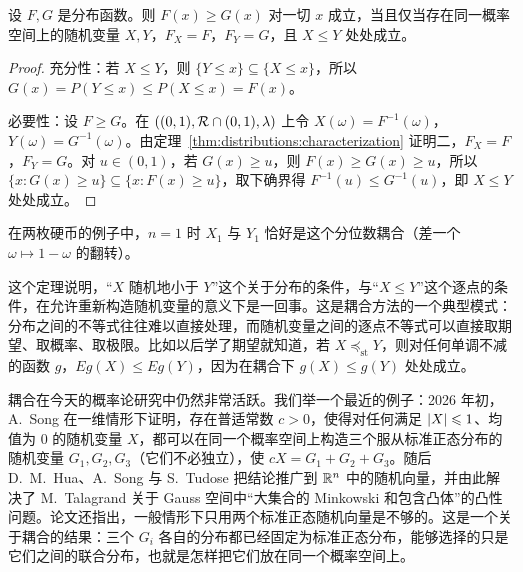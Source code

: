 \begin{theorem}[随机序的耦合刻画]\label{thm:distributions:stochastic-coupling}
设 $F,G$ 是分布函数。则 $F(x)\geqslant G(x)$ 对一切 $x$ 成立，当且仅当存在同一概率空间上的随机变量 $X,Y$，$F_X=F$，$F_Y=G$，且 $X\leqslant Y$ 处处成立。
\end{theorem}
\begin{proof}
充分性：若 $X\leqslant Y$，则 $\{Y\leqslant x\}\subseteq\{X\leqslant x\}$，所以 $G(x)=P(Y\leqslant x)\leqslant P(X\leqslant x)=F(x)$。

必要性：设 $F\geqslant G$。在 $((0,1),\mathcal{R}\cap(0,1),\lambda)$ 上令 $X(\omega)=F^{-1}(\omega)$，$Y(\omega)=G^{-1}(\omega)$。由定理~\ref{thm:distributions:characterization} 证明二，$F_X=F$，$F_Y=G$。对 $u\in(0,1)$，若 $G(x)\geqslant u$，则 $F(x)\geqslant G(x)\geqslant u$，所以 $\{x:G(x)\geqslant u\}\subseteq\{x:F(x)\geqslant u\}$，取下确界得 $F^{-1}(u)\leqslant G^{-1}(u)$，即 $X\leqslant Y$ 处处成立。
\end{proof}

在两枚硬币的例子中，$n=1$ 时 $X_1$ 与 $Y_1$ 恰好是这个分位数耦合（差一个 $\omega\mapsto1-\omega$ 的翻转）。

\begin{remark}
这个定理说明，“$X$ 随机地小于 $Y$”这个关于分布的条件，与“$X\leqslant Y$”这个逐点的条件，在允许重新构造随机变量的意义下是一回事。这是耦合方法的一个典型模式：分布之间的不等式往往难以直接处理，而随机变量之间的逐点不等式可以直接取期望、取概率、取极限。比如以后学了期望就知道，若 $X\preceq_{\mathrm{st}}Y$，则对任何单调不减的函数 $g$，$Eg(X)\leqslant Eg(Y)$，因为在耦合下 $g(X)\leqslant g(Y)$ 处处成立。
\end{remark}

\begin{historynote}
耦合在今天的概率论研究中仍然非常活跃。我们举一个最近的例子：2026 年初，A.\ Song 在一维情形下证明，存在普适常数 $c>0$，使得对任何满足 $\lvert X\rvert\leqslant1$、均值为 $0$ 的随机变量 $X$，都可以在同一个概率空间上构造三个服从标准正态分布的随机变量 $G_1,G_2,G_3$（它们不必独立），使 $cX=G_1+G_2+G_3$。随后 D.\ M.\ Hua、A.\ Song 与 S.\ Tudose 把结论推广到 $\mathbb{R}^n$ 中的随机向量，并由此解决了 M.\ Talagrand 关于 Gauss 空间中“大集合的 Minkowski 和包含凸体”的凸性问题。论文还指出，一般情形下只用两个标准正态随机向量是不够的。这是一个关于耦合的结果：三个 $G_i$ 各自的分布都已经固定为标准正态分布，能够选择的只是它们之间的联合分布，也就是怎样把它们放在同一个概率空间上。
\end{historynote}


